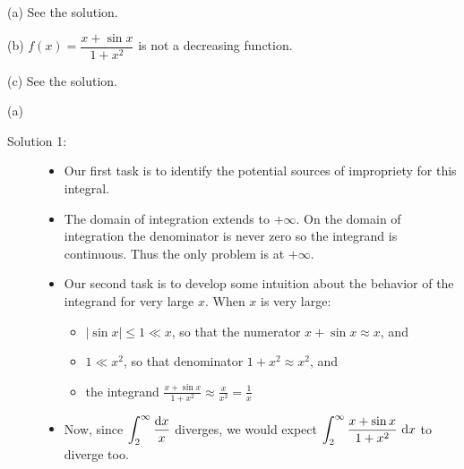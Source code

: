 \begin{answer}
(a) See the solution.

\noindent (b)
$f(x)=\dfrac{x+\sin x}{1+x^2}$ is not a decreasing function.

\noindent (c)
See the solution.

\end{answer}

\begin{solution} (a)
\begin{description}
\item[Solution 1:]
\begin{itemize}
 \item Our first task is to identify the potential sources of impropriety for
this integral.

\item The domain of integration extends to $+\infty$. On the domain of
integration the denominator is never zero so the integrand is continuous. Thus
the only problem is at $+\infty$.

\item Our second task is to develop some intuition about the behavior of
the integrand for very large $x$.  When $x$ is very large:
\begin{itemize}
\item $|\sin x|\le 1 \ll x$, so that the numerator $x+\sin x\approx x$, and
\item $1 \ll x^2$, so that denominator $1+x^2\approx x^2$, and
\item the integrand $\displaystyle\frac{x+\sin x}{1+x^2} \approx \frac{x}{x^2} =\frac{1}{x}$
\end{itemize}

\item
Now, since $\displaystyle\int_2^\infty\frac{\mathrm{d}x}{x}$ diverges,
we would expect $\displaystyle\int_2^\infty\frac{x+\sin x}{1+x^2}\ \dee{x}$ to diverge too.


\end{itemize}
\end{description}
\end{solution}

